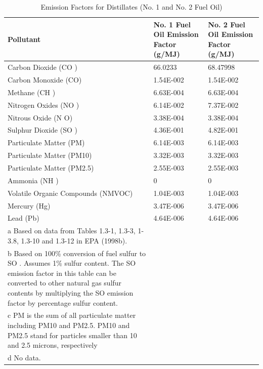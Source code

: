 \begin{longtable}[c]{p{3.0in}p{1.5in}p{1.5in}}
\caption{  Emission Factors for Distillates (No. 1 and No. 2 Fuel Oil) \protect \label{table:emission-factors-for-distillates-no.-1}}\\
\toprule 
Pollutant & No. 1 Fuel Oil Emission Factor   (g/MJ) & No. 2 Fuel Oil Emission Factor   (g/MJ) \tabularnewline \midrule
\endhead
Carbon Dioxide (CO  ) & 66.0233 & 68.47998 \tabularnewline
Carbon Monoxide (CO) & 1.54E-002 & 1.54E-002 \tabularnewline
Methane (CH  ) & 6.63E-004 & 6.63E-004 \tabularnewline
Nitrogen Oxides (NO  ) & 6.14E-002 & 7.37E-002 \tabularnewline
Nitrous Oxide (N  O) & 3.38E-004 & 3.38E-004 \tabularnewline
Sulphur Dioxide (SO  ) & 4.36E-001 & 4.82E-001 \tabularnewline
Particulate Matter (PM) & 6.14E-003 & 6.14E-003 \tabularnewline
Particulate Matter (PM10) & 3.32E-003 & 3.32E-003 \tabularnewline
Particulate Matter (PM2.5) & 2.55E-003 & 2.55E-003 \tabularnewline
Ammonia (NH  ) & 0 & 0 \tabularnewline
Volatile Organic Compounds (NMVOC) & 1.04E-003 & 1.04E-003 \tabularnewline
Mercury (Hg) & 3.47E-006 & 3.47E-006 \tabularnewline
Lead (Pb) & 4.64E-006 & 4.64E-006 \tabularnewline
a Based on data from Tables 1.3-1, 1.3-3, 1-3.8, 1.3-10 and 1.3-12 in EPA (1998b). &  &  \tabularnewline
b Based on 100\% conversion of fuel sulfur to SO  . Assumes 1\% sulfur content. The SO   emission factor in this table can be converted to other natural gas sulfur contents by multiplying the SO   emission factor by percentage sulfur content. &  &  \tabularnewline
c PM is the sum of all particulate matter including PM10 and PM2.5. PM10 and PM2.5 stand for particles smaller than 10 and 2.5 microns, respectively &  &  \tabularnewline
d No data. &  &  \tabularnewline
\bottomrule
\end{longtable}

